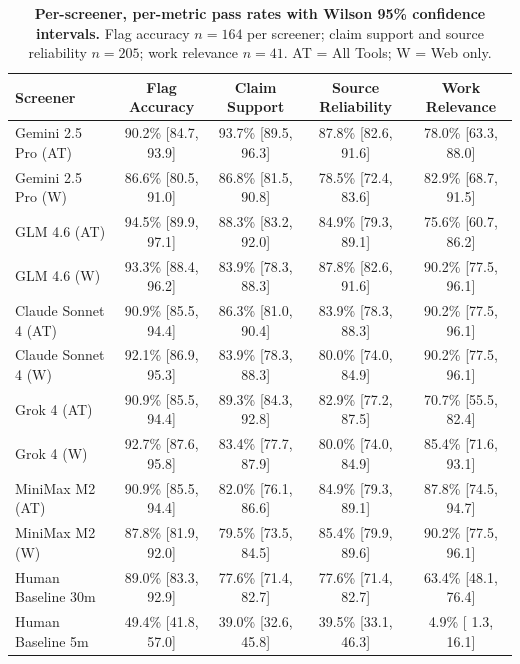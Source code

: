 \documentclass[12pt]{article}
\begin{document}
\begin{table}[H]
\centering
\caption{\textbf{Per-screener, per-metric pass rates with Wilson 95\% confidence intervals.} Flag accuracy $n = 164$ per screener; claim support and source reliability $n = 205$; work relevance $n = 41$. AT = All Tools; W = Web only.}
\label{tab:wilson_metric}
\small
\begin{tabular}{lcccc}
\toprule
\textbf{Screener} & \textbf{Flag Accuracy} & \textbf{Claim Support} & \textbf{Source Reliability} & \textbf{Work Relevance} \\
\midrule
Gemini 2.5 Pro (AT)  & 90.2\% [84.7, 93.9] & 93.7\% [89.5, 96.3] & 87.8\% [82.6, 91.6] & 78.0\% [63.3, 88.0] \\
Gemini 2.5 Pro (W)   & 86.6\% [80.5, 91.0] & 86.8\% [81.5, 90.8] & 78.5\% [72.4, 83.6] & 82.9\% [68.7, 91.5] \\
GLM 4.6 (AT)         & 94.5\% [89.9, 97.1] & 88.3\% [83.2, 92.0] & 84.9\% [79.3, 89.1] & 75.6\% [60.7, 86.2] \\
GLM 4.6 (W)          & 93.3\% [88.4, 96.2] & 83.9\% [78.3, 88.3] & 87.8\% [82.6, 91.6] & 90.2\% [77.5, 96.1] \\
Claude Sonnet 4 (AT) & 90.9\% [85.5, 94.4] & 86.3\% [81.0, 90.4] & 83.9\% [78.3, 88.3] & 90.2\% [77.5, 96.1] \\
Claude Sonnet 4 (W)  & 92.1\% [86.9, 95.3] & 83.9\% [78.3, 88.3] & 80.0\% [74.0, 84.9] & 90.2\% [77.5, 96.1] \\
Grok 4 (AT)          & 90.9\% [85.5, 94.4] & 89.3\% [84.3, 92.8] & 82.9\% [77.2, 87.5] & 70.7\% [55.5, 82.4] \\
Grok 4 (W)           & 92.7\% [87.6, 95.8] & 83.4\% [77.7, 87.9] & 80.0\% [74.0, 84.9] & 85.4\% [71.6, 93.1] \\
MiniMax M2 (AT)      & 90.9\% [85.5, 94.4] & 82.0\% [76.1, 86.6] & 84.9\% [79.3, 89.1] & 87.8\% [74.5, 94.7] \\
MiniMax M2 (W)       & 87.8\% [81.9, 92.0] & 79.5\% [73.5, 84.5] & 85.4\% [79.9, 89.6] & 90.2\% [77.5, 96.1] \\
Human Baseline 30m   & 89.0\% [83.3, 92.9] & 77.6\% [71.4, 82.7] & 77.6\% [71.4, 82.7] & 63.4\% [48.1, 76.4] \\
Human Baseline 5m    & 49.4\% [41.8, 57.0] & 39.0\% [32.6, 45.8] & 39.5\% [33.1, 46.3] &  4.9\% [ 1.3, 16.1] \\
\bottomrule
\end{tabular}
\end{table}
\end{document}

